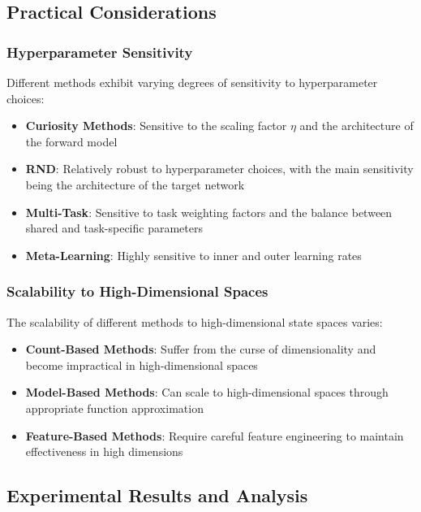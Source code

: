 \documentclass[12pt]{article}
\begin{document}
{{{\subsection{Practical Considerations}

\subsubsection{Hyperparameter Sensitivity}

Different methods exhibit varying degrees of sensitivity to hyperparameter choices:

\begin{itemize}
\item \textbf{Curiosity Methods}: Sensitive to the scaling factor $\eta$ and the architecture of the forward model
\item \textbf{RND}: Relatively robust to hyperparameter choices, with the main sensitivity being the architecture of the target network
\item \textbf{Multi-Task}: Sensitive to task weighting factors and the balance between shared and task-specific parameters
\item \textbf{Meta-Learning}: Highly sensitive to inner and outer learning rates
\end{itemize}

\subsubsection{Scalability to High-Dimensional Spaces}

The scalability of different methods to high-dimensional state spaces varies:

\begin{itemize}
\item \textbf{Count-Based Methods}: Suffer from the curse of dimensionality and become impractical in high-dimensional spaces
\item \textbf{Model-Based Methods}: Can scale to high-dimensional spaces through appropriate function approximation
\item \textbf{Feature-Based Methods}: Require careful feature engineering to maintain effectiveness in high dimensions
\end{itemize}

\subsection{Experimental Results and Analysis}

}}}
\end{document}

